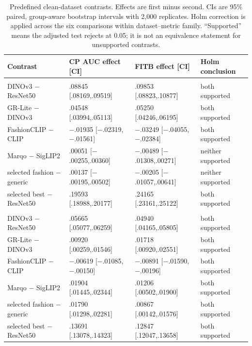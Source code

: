 \documentclass[preprint,12pt]{elsarticle}
\begin{document}
\begin{table}[htbp]
\caption{Predefined clean-dataset contrasts. Effects are first minus second. CIs are 95\% paired, group-aware bootstrap intervals with 2,000 replicates. Holm correction is applied across the six comparisons within dataset--metric family. ``Supported'' means the adjusted test rejects at 0.05; it is not an equivalence statement for unsupported contrasts.}
\label{stab:effects}
\centering\small
\setlength{\tabcolsep}{2pt}\renewcommand{\arraystretch}{1.06}
\begin{tabularx}{\textwidth}{@{}>{\raggedright\arraybackslash}p{}>{\centering\arraybackslash}p{}>{\centering\arraybackslash}p{}>{\raggedright\arraybackslash}X@{}}
\toprule
Contrast & CP AUC effect [CI] & FITB effect [CI] & Holm conclusion \\
\midrule
\multicolumn{4}{@{}l}{\textit{Polyvore-D-Clean}} \\
DINOv3 $-$ ResNet50 & .08845 [.08169,.09519] & .09853 [.08823,.10877] & both supported \\
GR-Lite $-$ DINOv3 & .04548 [.03994,.05113] & .05250 [.04246,.06195] & both supported \\
FashionCLIP $-$ CLIP & $-$.01935 [$-$.02319,$-$.01561] & $-$.03249 [$-$.04055,$-$.02384] & both supported \\
Marqo $-$ SigLIP2 & .00051 [$-$.00255,.00360] & $-$.00489 [$-$.01308,.00271] & neither supported \\
selected fashion $-$ generic & .00137 [$-$.00195,.00502] & $-$.00205 [$-$.01057,.00641] & neither supported \\
selected best $-$ ResNet50 & .19593 [.18988,.20177] & .24165 [.23161,.25122] & both supported \\
\midrule
\multicolumn{4}{@{}l}{\textit{IQON3000-Clean}} \\
DINOv3 $-$ ResNet50 & .05665 [.05077,.06259] & .04940 [.04165,.05805] & both supported \\
GR-Lite $-$ DINOv3 & .00920 [.00259,.01546] & .01718 [.00920,.02551] & both supported \\
FashionCLIP $-$ CLIP & $-$.00619 [$-$.01085,$-$.00150] & $-$.00891 [$-$.01590,$-$.00196] & both supported \\
Marqo $-$ SigLIP2 & .01904 [.01445,.02344] & .01206 [.00502,.01900] & both supported \\
selected fashion $-$ generic & .01790 [.01298,.02281] & .00867 [.00142,.01576] & both supported \\
selected best $-$ ResNet50 & .13691 [.13078,.14323] & .12847 [.12047,.13658] & both supported \\
\bottomrule
\end{tabularx}
\end{table}
\end{document}
